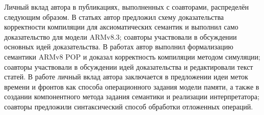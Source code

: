 {\begin{refsection}
        Личный вклад автора в публикациях, выполненных с соавторами, распределён следующим образом.
        В статьях \cite{Podkopaev-al:NTV17,Podkopaev-al:ISPRAS17}  автор предложил  схему
        доказательства корректности компиляции для аксиоматических семантик и выполнил само доказательство для модели ARMv8.3;
        соавторы участвовали в обсуждении основных идей доказательства.
        В работах \cite{Podkopaev-al:ECOOP17, Podkopaev-al:PLC17}
        автор выполнил формализацию семантики ARMv8 POP и доказал корректность компиляции методом симуляции;
        соавторы участвовали в обсуждении идей доказательства и редактировали текст статей.
        В работе \cite{Podkopaev-al:CoRR16} личный вклад автора заключается в предложении идеи меток времени и фронтов как способа
        операционного задания модели памяти, а также в создании компонентного метода задания семантики и реализации интерпретатора;
        соавторы предложили синтаксический способ обработки отложенных операций.
    \end{refsection}
    \begin{refsection}[vak,papers,conf]%
        \printbibliography[heading=countauthorvak, env=countauthorvak, keyword=biblioauthorvak, section=2]%
        \printbibliography[heading=countauthornotvak, env=countauthornotvak, keyword=biblioauthornotvak, section=2]%
        \printbibliography[heading=countauthorconf, env=countauthorconf, keyword=biblioauthorconf, section=2]%
        \printbibliography[heading=countauthor, env=countauthor, keyword=biblioauthor, section=2]%
        \nocite{Podkopaev-al:NTV17}%
        \nocite{Podkopaev-al:ISPRAS17}%
        \nocite{Podkopaev-al:ECOOP17}%
        \nocite{Podkopaev-al:PLC17,Podkopaev-al:CoRR16}%
    \end{refsection}
}
